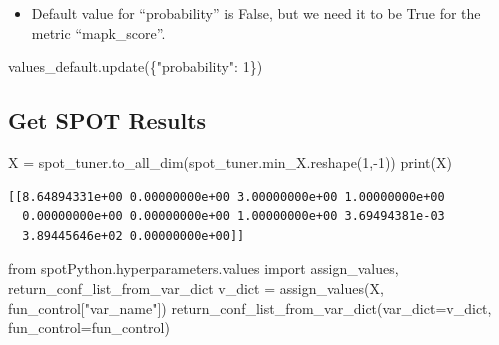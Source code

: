 \documentclass[
  letterpaper,
  DIV=11,
  numbers=noendperiod]{scrreprt}
\newenvironment{Shaded}{\begin{snugshade}}{\end{snugshade}}
\newcommand{\BuiltInTok}[1]{\textcolor[rgb]{0.00,0.23,0.31}{#1}}
\newcommand{\DecValTok}[1]{\textcolor[rgb]{0.68,0.00,0.00}{#1}}
\newcommand{\ImportTok}[1]{\textcolor[rgb]{0.00,0.46,0.62}{#1}}
\newcommand{\NormalTok}[1]{\textcolor[rgb]{0.00,0.23,0.31}{#1}}
\newcommand{\OperatorTok}[1]{\textcolor[rgb]{0.37,0.37,0.37}{#1}}
\newcommand{\StringTok}[1]{\textcolor[rgb]{0.13,0.47,0.30}{#1}}
\providecommand{\tightlist}{%
  \setlength{\itemsep}{0pt}\setlength{\parskip}{0pt}}\usepackage{longtable,booktabs,array}
\begin{document}
\begin{tcolorbox}[enhanced jigsaw, rightrule=.15mm, opacityback=0, colframe=quarto-callout-note-color-frame, opacitybacktitle=0.6, toptitle=1mm, arc=.35mm, colbacktitle=quarto-callout-note-color!10!white, coltitle=black, toprule=.15mm, leftrule=.75mm, titlerule=0mm, title=\textcolor{quarto-callout-note-color}{\faInfo}\hspace{0.5em}{Note}, bottomrule=.15mm, breakable, bottomtitle=1mm, left=2mm, colback=white]

\begin{itemize}
\tightlist
\item
  Default value for ``probability'' is False, but we need it to be True
  for the metric ``mapk\_score''.
\end{itemize}

\begin{Shaded}
\begin{Highlighting}[]
\NormalTok{values\_default.update(\{}\StringTok{"probability"}\NormalTok{: }\DecValTok{1}\NormalTok{\})}
\end{Highlighting}
\end{Shaded}

\end{tcolorbox}

\hypertarget{get-spot-results-3}{%
\subsection{Get SPOT Results}\label{get-spot-results-3}}

\begin{Shaded}
\begin{Highlighting}[]
\NormalTok{X }\OperatorTok{=}\NormalTok{ spot\_tuner.to\_all\_dim(spot\_tuner.min\_X.reshape(}\DecValTok{1}\NormalTok{,}\OperatorTok{{-}}\DecValTok{1}\NormalTok{))}
\BuiltInTok{print}\NormalTok{(X)}
\end{Highlighting}
\end{Shaded}

\begin{verbatim}
[[8.64894331e+00 0.00000000e+00 3.00000000e+00 1.00000000e+00
  0.00000000e+00 0.00000000e+00 1.00000000e+00 3.69494381e-03
  3.89445646e+02 0.00000000e+00]]
\end{verbatim}

\begin{Shaded}
\begin{Highlighting}[]
\ImportTok{from}\NormalTok{ spotPython.hyperparameters.values }\ImportTok{import}\NormalTok{ assign\_values, return\_conf\_list\_from\_var\_dict}
\NormalTok{v\_dict }\OperatorTok{=}\NormalTok{ assign\_values(X, fun\_control[}\StringTok{"var\_name"}\NormalTok{])}
\NormalTok{return\_conf\_list\_from\_var\_dict(var\_dict}\OperatorTok{=}\NormalTok{v\_dict, fun\_control}\OperatorTok{=}\NormalTok{fun\_control)}
\end{Highlighting}
\end{Shaded}
\end{document}
